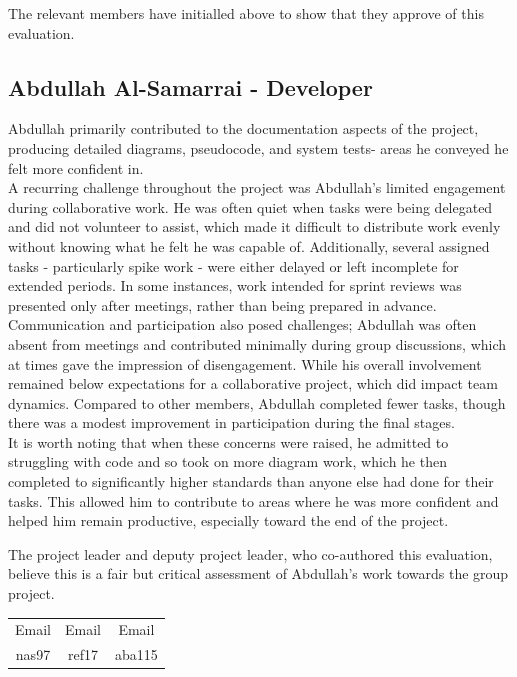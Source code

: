 \documentclass[a4paper]{project}
\begin{document}
			The relevant members have initialled above to show that they approve of this evaluation.
		
		\subsection{Abdullah Al-Samarrai - Developer}\label{subsec:performance-abdullah-al-samarrai}
		
			Abdullah primarily contributed to the documentation aspects of the project, producing detailed diagrams, pseudocode, and system tests- areas he conveyed he felt more confident in. \\
			A recurring challenge throughout the project was Abdullah’s limited engagement during collaborative work. He was often quiet when tasks were being delegated and did not volunteer to assist, which made it difficult to distribute work evenly without knowing what he felt he was capable of. Additionally, several assigned tasks - particularly spike work - were either delayed or left incomplete for extended periods. In some instances, work intended for sprint reviews was presented only after meetings, rather than being prepared in advance. \\
			Communication and participation also posed challenges; Abdullah was often absent from meetings and contributed minimally during group discussions, which at times gave the impression of disengagement. While his overall involvement remained below expectations for a collaborative project, which did impact team dynamics. Compared to other members, Abdullah completed fewer tasks, though there was a modest improvement in participation during the final stages. \\
			It is worth noting that when these concerns were raised, he admitted to struggling with code and so took on more diagram work, which he then completed to significantly higher standards than anyone else had done for their tasks. This allowed him to contribute to areas where he was more confident and helped him remain productive, especially toward the end of the project.
		
			The project leader and deputy project leader, who co-authored this evaluation, believe this is a fair but critical assessment of Abdullah's work towards the group project.
			
			\begin{center}
				\setlength{\tabcolsep}{0.05\paperwidth}
				\begin{tabular}{c c c}
					Email & Email & Email  \\
					nas97 & ref17 & aba115
				\end{tabular}
			\end{center}
			
\end{document}
